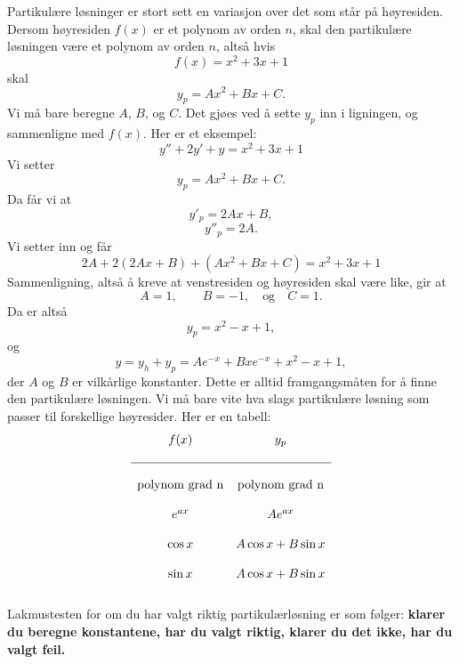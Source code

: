 Partikul{\ae}re l{\o}sninger er stort sett en variasjon over det som st{\aa}r p{\aa} h{\o}yresiden. Dersom h{\o}yresiden $f(x)$ er et polynom av orden $n$, skal den partikul{\ae}re
l{\o}sningen v{\ae}re et polynom av orden $n$, alts{\aa} hvis
\begin{equation*}
f(x)=x^{2}+3x+1 
\end{equation*}
 skal 
 \begin{equation*}
y_{p}=Ax^{2}+Bx+C.
\end{equation*}
Vi m{\aa} bare beregne $A$, $B$, og $C$. Det gj{\o}es ved {\aa} sette $y_{p}$ inn i ligningen, og sammenligne med $f(x)$. Her er et eksempel:
\begin{equation*}
y''+2y'+y=x^{2}+3x+1 
\end{equation*}
Vi setter
\begin{equation*}
y_{p}=Ax^{2}+Bx+C.
\end{equation*}
Da f{\aa}r vi at 
\begin{equation*}
y'_{p}=2Ax+B, 
\end{equation*}
\begin{equation*}
y''_{p}=2A.
\end{equation*}
Vi setter inn og f{\aa}r 
\begin{equation*}
2A+2(2Ax+B)+(Ax^{2}+Bx+C)=x^{2}+3x+1 
\end{equation*}
Sammenligning, alts{\aa} {\aa} kreve at venstresiden og h{\o}yresiden skal v{\ae}re like, gir at 
\begin{equation*}
A=1, \quad \text{} \quad B=-1,\quad \text{og} \quad C=1.
\end{equation*}
Da er alts{\aa} 
\begin{equation*}
y_{p}=x^{2}-x+1,
\end{equation*}
og
\begin{equation*}
y=y_{h}+y_{p}=Ae^{-x}+Bxe^{-x}+x^{2}-x+1,
\end{equation*}
der $A$ og $B$ er vilk{\aa}rlige konstanter. 
Dette er alltid framgangsm{\aa}ten for {\aa} finne den partikul{\ae}re l{\o}sningen. Vi m{\aa} bare vite hva slags partikul{\ae}re l{\o}sning som passer til forskellige
h{\o}yresider. Her er en tabell:
\begin{equation*}
\begin{matrix}
f(x) & y_{p} \\ \\ \hline \\
\text{polynom grad n} & \text{polynom grad n} \\ \\
e^{ax} & Ae^{ax} \\ \\
\cos{x} & A\cos{x} + B \sin x \\ \\
\sin{x} & A\cos{x} + B \sin x \\ \\
\end{matrix}
\end{equation*}
Lakmustesten for om du har valgt riktig partikul{\ae}rl{\o}sning er som f{\o}lger: \textbf{klarer du beregne konstantene, har du valgt riktig, klarer du det ikke, har du valgt feil.}


